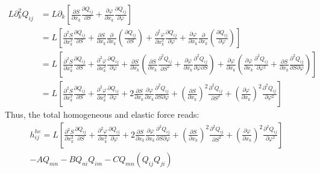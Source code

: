 \documentclass[leqno]{article}
\begin{document}
	\begin{align*}
		L\partial_k^2 Q_{ij} &= L\partial_k \left[\frac{\partial S}{\partial x_k} \frac{\partial Q_{ij}}{\partial S} + \frac{\partial \varphi}{\partial x_k} \frac{\partial Q_{ij}}{\partial \varphi} \right]\\
		&= L \left[ \frac{\partial^2 S}{\partial x_k^2} \frac{\partial Q_{ij}}{\partial S} + \frac{\partial S}{\partial x_k} \frac{\partial}{\partial x_k} \left( \frac{\partial Q_{ij}}{\partial S}\right) +  \frac{\partial^2 \varphi}{\partial x_k^2} \frac{\partial Q_{ij}}{\partial \varphi} + \frac{\partial \varphi}{\partial x_k} \frac{\partial}{\partial x_k} \left( \frac{\partial Q_{ij}}{\partial \varphi} \right) \right] \\
		&= L\left[ \frac{\partial^2 S}{\partial x_k^2} \frac{\partial Q_{ij}}{\partial S} + \frac{\partial^2 \varphi}{\partial x_k^2} \frac{\partial Q_{ij}}{\partial \varphi} + \frac{\partial S}{\partial x_k} \left( \frac{\partial S}{\partial x_k} \frac{\partial^2 Q_{ij}}{\partial S^2} + \frac{\partial \varphi}{\partial x_k} \frac{\partial^2 Q_{ij}}{\partial \varphi \partial S} \right) + \frac{\partial \varphi}{\partial x_k} \left( \frac{\partial \varphi}{\partial x_k} \frac{\partial^2 Q_{ij}}{\partial \varphi^2} + \frac{\partial S}{\partial x_k} \frac{\partial^2 Q_{ij}}{\partial S \partial \varphi} \right) \right] \\
		&= L\left[ \frac{\partial^2 S}{\partial x_k^2} \frac{\partial Q_{ij}}{\partial S} + \frac{\partial^2 \varphi}{\partial x_k^2} \frac{\partial Q_{ij}}{\partial \varphi} + 2 \frac{\partial S}{\partial x_k} \frac{\partial \varphi}{\partial x_k} \frac{\partial^2 Q_{ij}}{\partial S \partial \varphi} + \left( \frac{\partial S}{\partial x_k} \right)^2 \frac{\partial^2 Q_{ij}}{\partial S^2} + \left( \frac{\partial \varphi}{\partial x_k} \right)^2 \frac{\partial^2 Q_{ij}}{\partial \varphi^2} \right]
	\end{align*}
	Thus, the total homogeneous and elastic force reads:
	\begin{multline*}
		h^{he}_{ij} = L\left[ \frac{\partial^2 S}{\partial x_k^2} \frac{\partial Q_{ij}}{\partial S} + \frac{\partial^2 \varphi}{\partial x_k^2} \frac{\partial Q_{ij}}{\partial \varphi} + 2 \frac{\partial S}{\partial x_k} \frac{\partial \varphi}{\partial x_k} \frac{\partial^2 Q_{ij}}{\partial S \partial \varphi} + \left( \frac{\partial S}{\partial x_k} \right)^2 \frac{\partial^2 Q_{ij}}{\partial S^2} + \left( \frac{\partial \varphi}{\partial x_k} \right)^2 \frac{\partial^2 Q_{ij}}{\partial \varphi^2} \right] \\ - A Q_{mn} - BQ_{ni}Q_{im} - C Q_{mn} (Q_{ij}Q_{ji})
	\end{multline*}
	
\end{document}
